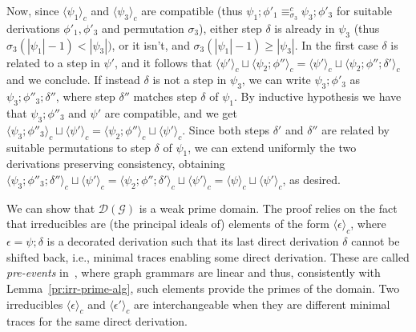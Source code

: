 \documentclass[conference]{IEEEtran}
\renewenvironment{proof}{\begin{IEEEproof}}{\end{IEEEproof}}
\newcommand{\zdom}[0]{\ensuremath{\mathcal{D}}}
\newcommand{\dom}[1]{\ensuremath{\zdom({#1})}}
\newcommand{\perm}{\sigma}
\newcommand{\ltrace}[1]{\ensuremath{\langle {#1}\rangle_c}}
\begin{document}
\begin{proof}
\begin{enumerate}
    Now, since $\ltrace{\psi_1}$ and  $\ltrace{\psi_3}$ are compatible (thus
    $\psi_1;\phi'_1 \equiv^c_{\perm_3} \psi_3;\phi'_3$ for suitable derivations 
    $\phi'_1, \phi'_3$ and permutation $\perm_3$), either step $\delta$ is 
    already in $\psi_3$ (thus $\perm_3(|\psi_1|-1) < |\psi_3|)$, or it isn't, and 
    $\perm_3(|\psi_1|-1) \geq |\psi_3|$. In the first case $\delta$ is related to 
    a step in $\psi'$, and it follows that $\ltrace{\psi'} \sqcup  \ltrace{\psi_2; \phi''} = 
    \ltrace{\psi'} \sqcup  \ltrace{\psi_2; \phi'';\delta'}$ and we conclude. 
    If instead $\delta$ is not a step in $\psi_3$,  we can write $\psi_3;\phi'_3$ as
     $\psi_3;\phi''_3;\delta''$, where step $\delta''$ matches step $\delta$ of $\psi_1$.
     By inductive hypothesis we have that $\psi_3;\phi''_3$ and $\psi'$ are compatible, 
     and we get $\ltrace{\psi_3;\phi''_3} \sqcup \ltrace{\psi'} = 
     \ltrace{\psi_2;\phi''} \sqcup \ltrace{\psi'}$. Since both steps $\delta'$ and $\delta''$ are 
     related by suitable
     permutations to step $\delta$ of $\psi_1$, we 
     can extend uniformly the two derivations preserving consistency,  obtaining
      $\ltrace{\psi_3;\phi''_3;\delta''} \sqcup \ltrace{\psi'} = 
     \ltrace{\psi_2;\phi'';\delta'} \sqcup \ltrace{\psi'} =  \ltrace{\psi} \sqcup \ltrace{\psi'}$, as desired.
        
%    
      \end{enumerate}
\end{proof}


We can show that $\dom{\mathcal{G}}$ is a weak prime domain. The proof relies on the fact that irreducibles
are (the principal ideals of) elements of the form $\ltrace{\epsilon}$, where
$\epsilon = \psi; \delta$ is a decorated derivation such that its last
direct derivation $\delta$ cannot be shifted back, i.e., minimal
traces enabling some direct derivation. These are called
\emph{pre-events} in~\cite{Handbook,Bal:PhD}, where graph
grammars are linear and thus, consistently with Lemma~\ref{pr:irr-prime-alg}, such
elements provide the primes of the domain. Two irreducibles
$\ltrace{\epsilon}$ and $\ltrace{\epsilon'}$ are interchangeable when
they are different minimal traces for the same direct derivation. 
\end{document}
